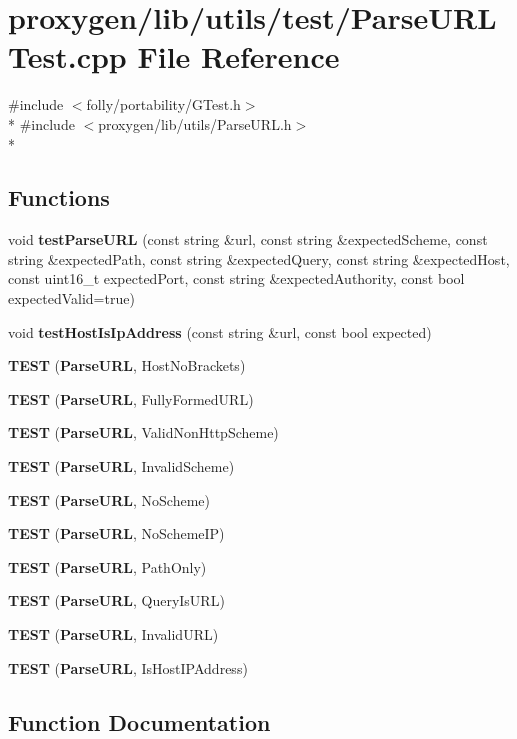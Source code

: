 \section{proxygen/lib/utils/test/\+Parse\+U\+R\+L\+Test.cpp File Reference}
\label{ParseURLTest_8cpp}
{\ttfamily \#include $<$folly/portability/\+G\+Test.\+h$>$}\\*
{\ttfamily \#include $<$proxygen/lib/utils/\+Parse\+U\+R\+L.\+h$>$}\\*
\subsection*{Functions}
\begin{DoxyCompactItemize}
\item 
void {\bf test\+Parse\+U\+RL} (const string \&url, const string \&expected\+Scheme, const string \&expected\+Path, const string \&expected\+Query, const string \&expected\+Host, const uint16\+\_\+t expected\+Port, const string \&expected\+Authority, const bool expected\+Valid=true)
\item 
void {\bf test\+Host\+Is\+Ip\+Address} (const string \&url, const bool expected)
\item 
{\bf T\+E\+ST} ({\bf Parse\+U\+RL}, Host\+No\+Brackets)
\item 
{\bf T\+E\+ST} ({\bf Parse\+U\+RL}, Fully\+Formed\+U\+RL)
\item 
{\bf T\+E\+ST} ({\bf Parse\+U\+RL}, Valid\+Non\+Http\+Scheme)
\item 
{\bf T\+E\+ST} ({\bf Parse\+U\+RL}, Invalid\+Scheme)
\item 
{\bf T\+E\+ST} ({\bf Parse\+U\+RL}, No\+Scheme)
\item 
{\bf T\+E\+ST} ({\bf Parse\+U\+RL}, No\+Scheme\+IP)
\item 
{\bf T\+E\+ST} ({\bf Parse\+U\+RL}, Path\+Only)
\item 
{\bf T\+E\+ST} ({\bf Parse\+U\+RL}, Query\+Is\+U\+RL)
\item 
{\bf T\+E\+ST} ({\bf Parse\+U\+RL}, Invalid\+U\+RL)
\item 
{\bf T\+E\+ST} ({\bf Parse\+U\+RL}, Is\+Host\+I\+P\+Address)
\end{DoxyCompactItemize}


\subsection{Function Documentation}
